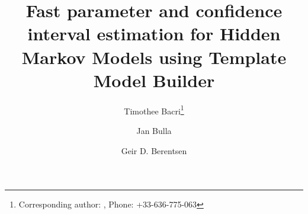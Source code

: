 \documentclass[bimj,fleqn]{w-art}\usepackage[]{graphicx}\usepackage[]{color}
\makeatletter
\newenvironment{kframe}{%
 \def\at@end@of@kframe{}%
 \ifinner\ifhmode%
  \def\at@end@of@kframe{\end{minipage}}%
  \begin{minipage}{\columnwidth}%
 \fi\fi%
 \def\FrameCommand##1{\hskip\@totalleftmargin \hskip-\fboxsep
 \colorbox{shadecolor}{##1}\hskip-\fboxsep
     \hskip-\linewidth \hskip-\@totalleftmargin \hskip\columnwidth}%
 \MakeFramed {\advance\hsize-\width
   \@totalleftmargin\z@ \linewidth\hsize
   \@setminipage}}%
 {\par\unskip\endMakeFramed%
 \at@end@of@kframe}
\newenvironment{knitrout}{}{} %
\theoremstyle{plain}
\theoremstyle{definition}
\makeatother
\begin{document}
              



\begin{knitrout}
\color{fgcolor}\begin{kframe}


{\ttfamily\noindent\bfseries{}}\end{kframe}
\end{knitrout}



\title[Running title]{Fast parameter and confidence interval estimation for Hidden Markov Models using Template Model Builder}
\author[First Author{\it{et al.}}]{Timothee Bacri\footnote{Corresponding author: {}, Phone: +33-636-775-063}}
\address[\inst{1}]{Department of Statistics, University of Bergen, 5007 Bergen, Norway}
\author[dd]{Jan Bulla}
\author[]{Geir D. Berentsen}
\address[\inst{2}]{Department of Business and Management Science, Norwegian School of Economics, Helleveien 30, 5045 Bergen, Norway}
  
\end{document}
